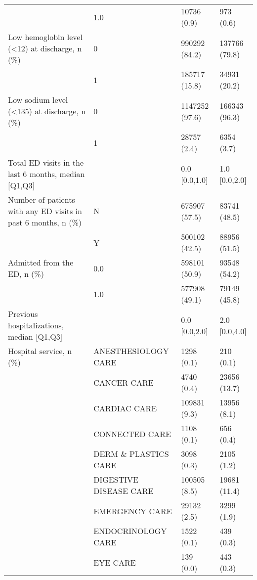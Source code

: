 \begin{tabular}{llll}
                                       & 1.0 &        10736 (0.9) &          973 (0.6) \\
Low hemoglobin level (<12) at discharge, n (\%) & 0 &      990292 (84.2) &      137766 (79.8) \\
                                       & 1 &      185717 (15.8) &       34931 (20.2) \\
Low sodium level (<135) at discharge, n (\%) & 0 &     1147252 (97.6) &      166343 (96.3) \\
                                       & 1 &        28757 (2.4) &         6354 (3.7) \\
Total ED visits in the last 6 months, median [Q1,Q3] &   &      0.0 [0.0,1.0] &      1.0 [0.0,2.0] \\
Number of patients with any ED visits in past 6 months, n (\%) & N &      675907 (57.5) &       83741 (48.5) \\
                                       & Y &      500102 (42.5) &       88956 (51.5) \\
Admitted from the ED, n (\%) & 0.0 &      598101 (50.9) &       93548 (54.2) \\
                                       & 1.0 &      577908 (49.1) &       79149 (45.8) \\
Previous hospitalizations, median [Q1,Q3] &   &      0.0 [0.0,2.0] &      2.0 [0.0,4.0] \\
Hospital service, n (\%) & ANESTHESIOLOGY CARE &         1298 (0.1) &          210 (0.1) \\
                                       & CANCER CARE &         4740 (0.4) &       23656 (13.7) \\
                                       & CARDIAC CARE &       109831 (9.3) &        13956 (8.1) \\
                                       & CONNECTED CARE &         1108 (0.1) &          656 (0.4) \\
                                       & DERM \& PLASTICS CARE &         3098 (0.3) &         2105 (1.2) \\
                                       & DIGESTIVE DISEASE CARE &       100505 (8.5) &       19681 (11.4) \\
                                       & EMERGENCY CARE &        29132 (2.5) &         3299 (1.9) \\
                                       & ENDOCRINOLOGY CARE &         1522 (0.1) &          439 (0.3) \\
                                       & EYE CARE &          139 (0.0) &          443 (0.3) \\

\end{tabular}
